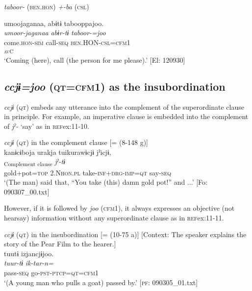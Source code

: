   \textit{taboor-} (\textsc{ben}.\textsc{hon}) \textit{+-ba} (\textsc{csl})

  \ex  
      \gllll    umoojaganaa,  abɨtɨ  tabooppajoo.\\
      \textit{umoor-jaganaa}  \textit{abɨr-tɨ}  \textit{taboor-=joo}\\
      come.\textsc{hon}-\textsc{sim}  call-\textsc{seq}  \textsc{ben}.HON-\textsc{csl}=\textsc{cfm}1\\
        [Lex. verb  Aux. verb]\textsubscript{\textsc{av}C}\\
      \glt ‘Coming (here), call (the person for me please).’      [El: 120930]
\z
\z

\subsection{\textit{ccjɨ=joo} (\textsc{qt}=\textsc{cfm}1) as the insubordination}\label{sec:11.2.3}

\textit{ccjɨ} (\textsc{qt}) embeds any utterance into the complement of the superordinate clause in principle. For example, an imperative clause is embedded into the complement of \textit{jˀ-} ‘say’ as in \textsc{ref}{ex:11-10}.

\ea\label{ex:11-10}  \textit{ccjɨ} (\textsc{qt}) in the complement clause [= (8-148 g)]\\
  
      \glll    kanɨcɨboja  urakja  tuikurawɨcjɨ  jˀicjɨ,\\
    [\textit{kanɨ+cɨbo=ja}  \textit{urakja}  \textit{tur-i+kuraw-ɨ=\Highlight{ccjɨ}}]\textsubscript{Complement clause}  \textit{jˀ-tɨ}\\
    gold+pot=\textsc{top}  2.N\textsc{hon}.\textsc{pl}  take-\textsc{inf}+\textsc{drg}-\textsc{imp}=\textsc{qt}  say-\textsc{seq}\\
    \glt     ‘(The man) said that, “You take (this) damn gold pot!” and ...’ [Fo: 090307\_00.txt]
\z

However, if it is followed by \textit{joo} (\textsc{cfm}1), it always expresses an objective (not hearsay) information without any superordinate clause as in \textsc{ref}{ex:11-11}.

\ea\label{ex:11-11}  \textit{ccjɨ} (\textsc{qt}) in the insubordination [= (10-75 a)]   [Context: The speaker explains the story of the Pear Film to the hearer.]\\
  
      \glll    tuutɨ  izjancjɨjoo.\\
    \textit{tuur-tɨ}  \textit{ik-tar-n=}\\
    pass-\textsc{seq}  go-\textsc{pst}-\textsc{ptcp}=\textsc{qt}=\textsc{cfm}1\\
    \glt     ‘(A young man who pulls a goat) passed by.’ [\textsc{pf}: 090305\_01.txt]
\z

